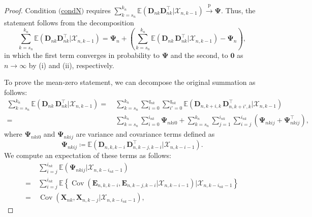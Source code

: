 \documentclass[11pt]{article}
\renewcommand\vec[1]{\boldsymbol{#1}}
\newcommand\mat[1]{\mathbf{#1}}
\DeclareMathOperator{\Cov}{Cov}
\newcommand{\E}{\mathbb{E}}
\newcommand{\X}{\mathcal{X}}
\newcommand{\I}{\mathcal{I}}
\newcommand{\refitem}[1]{$\mathrm{(}$\hyperlink{cond:#1}{\csname cond#1\endcsname}$\mathrm{)}$}
\newcommand{\pconverge}{\overset{\mathrm{p}}{\to}}
\theoremstyle{definition}
\begin{document}
\begin{proof}
Condition \refitem{N} requires  $\sum_{k=s_n}^{k_n} \E(\vec{D}_{nk} \vec{D}_{nk}^{\top} | \X_{n,k-1}) \pconverge \mat{\Psi}$.
Thus, the statement follows from the decomposition
\[
\sum_{k=s_n}^{k_n} \E(\vec{D}_{nk} \vec{D}_{nk}^{\top} | \X_{n,k-1}) = \mat{\Psi}_n + \left(\sum_{k=s_n}^{k_n} \E\left(\vec{D}_{nk}\, \vec{D}_{nk}^{\top} | \X_{n,k-1}\right) - \mat{\Psi}_n\right),
\]
in which the first term converges in probability to $\mat{\Psi}$ and the second, to $\mat{0}$ as $n \to \infty$ by (i) and (ii), respectively.

To prove the mean-zero statement, we can decompose the original summation as follows:
\begin{align}
\sum_{k=s_n}^{k_n} \E\left(\vec{D}_{nk}\, \vec{D}_{nk}^{\top} | \X_{n,k-1}\right)
=&\ \sum_{k=s_n}^{k_n} \sum_{i=0}^{q_{nk}} \sum_{i'=0}^{q_{nk}} \E\left(\vec{D}_{n,k+i,k}\, \vec{D}_{n,k+i',k}^{\top} | \X_{n,k-1}\right) \nonumber\\
=&\ \sum_{k=s_n}^{k_n} \sum_{i=0}^{i_{nk}} \mat{\Psi}_{nki0}
+ \sum_{k=s_n}^{k_n}
\sum_{j=1}^{i_{nk}}
\sum_{i=j}^{i_{nk}}
\left(\mat{\Psi}_{nkij} + \mat{\Psi}_{nkij}^{\top}\right),\label{eq:nesting-decomp}
\end{align}
where $\mat{\Psi}_{nki0}$ and $\mat{\Psi}_{nkij}$ are variance and covariance terms defined as
\[
\mat{\Psi}_{nkij} \coloneqq \E\left(\vec{D}_{n,k,k-i}\, \vec{D}_{n,k-j,k-i}^{\top} | \X_{n,k-i-1}\right).
\]
We compute an expectation of these terms as follows:
\begin{align*}
&\ \sum_{i=j}^{i_{nk}} \E \left( \mat{\Psi}_{nkij} \Big| \X_{n,k-i_{nk}-1}\right) \\
= &\ \sum_{i=j}^{i_{nk}} \E \left\{ \Cov\left(\vec{E}_{n,k,k-i}, \vec{E}_{n,k-j,k-i} \Big| \X_{n,k-i-1}\right) \Big| \X_{n,k-i_{nk}-1}\right\} \\
= &\ \Cov(\vec{X}_{nk}, \vec{X}_{n,k-j} | \X_{n,k-i_{nk}-1}),

\end{align*}
\end{proof}
\end{document}
